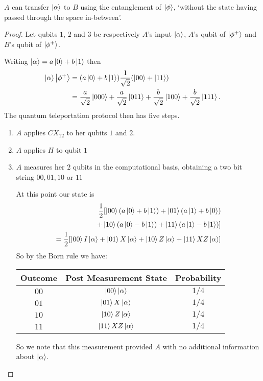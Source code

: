 \documentclass[a4paper]{article}
\begin{document}
\begin{theorem}
	$A$ can transfer $\ket{\alpha}$ to $B$ using the entanglement of $\ket{\phi}$, `without the state having passed through the space in-between'.
\end{theorem}
\begin{proof}
	Let qubits $1$, $2$ and $3$ be respectively $A$'s input $\ket{\alpha}$, $A$'s qubit of $\ket{\phi^+}$ and $B$'s qubit of $\ket{\phi^+}$. 

	Writing $\ket{\alpha} = a\ket{0} + b\ket{1}$ then
	\begin{align*}
		\ket{\alpha}\ket{\phi^+} &= (a \ket{0} + b \ket{1}) \frac{1}{\sqrt{2}}(\ket{00} + \ket{11}) \\
		&= \frac{a}{\sqrt{2}}\ket{000} + \frac{a}{\sqrt{2}}\ket{011} + \frac{b}{\sqrt{2}}\ket{100} + \frac{b}{\sqrt{2}}\ket{111}.
	\end{align*}
	The quantum teleportation protocol then has five steps.
	\begin{enumerate}
		\item $A$ applies $CX_{12}$ to her qubits $1$ and $2$.
		\item $A$ applies $H$ to qubit $1$
		\item $A$ measures her $2$ qubits in the computational basis, obtaining a two bit string $00, 01, 10$ or $11$
		
		At this point our state is
		\begin{align*}
			\frac{1}{2}[\ket{00}(a\ket{0} + b\ket{1}) + \ket{01}(a\ket{1} + b\ket{0})\\ + \ket{10}(a\ket{0} - b\ket{1}) + \ket{11}(a\ket{1} - b\ket{1})] \\
		= \frac{1}{2}[\ket{00} I \ket{\alpha}+\ket{01} X \ket{\alpha}+\ket{10} Z \ket{\alpha}+\ket{11} XZ \ket{\alpha}]
		\end{align*}
		So by the Born rule we have:
		\begin{center}
%
	\begin{tabular}{@{}ccc@{}}
	\toprule
	Outcome       & Post Measurement State & Probability \\ \midrule
	$00$			  & $\ket{00}\ket{\alpha}$       &  $1/4$           \\
	$01$	          & $\ket{01}X\ket{\alpha}$                   &   $1/4$          \\
	$10$			  &    $\ket{10}Z\ket{\alpha}$                    &  $1/4$           \\ 
	$11$			  &      $\ket{11}XZ\ket{\alpha}$                  &    $1/4$         \\ \bottomrule
	\end{tabular}
		\end{center}
		So we note that this measurement provided $A$ with no additional information about $\ket{\alpha}$.


\end{enumerate}
\end{proof}
\end{document}
